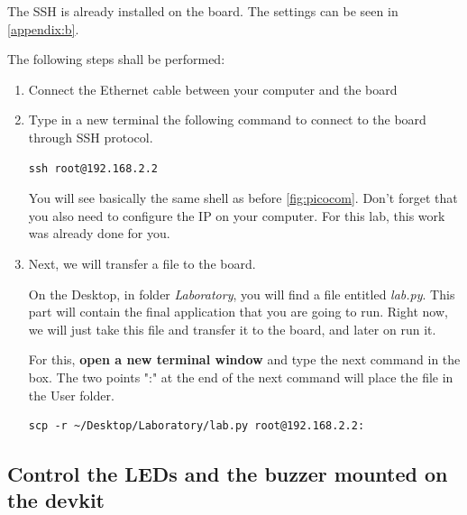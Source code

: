 The SSH is already installed on the board. The settings can be seen in \cref{appendix:b}.

The following steps shall be performed: 
\begin{enumerate}
    \item Connect the Ethernet cable between your computer and the board
    \item Type in a new terminal the following command to connect to the board through SSH protocol.
    \begin{tcolorbox}
        \begin{verbatim}
ssh root@192.168.2.2
        \end{verbatim}
    \end{tcolorbox}
    You will see basically the same shell as before \ref{fig:picocom}.
    Don't forget that you also need to configure the IP on your computer. For this lab, this work was already done for you.

    \item Next, we will transfer a file to the board.

    On the Desktop, in folder \textit{Laboratory}, you will find a file entitled \textit{lab.py}. This part will contain the final application that you are going to run. Right now, we will just take this file and transfer it to the board, and later on run it.

    For this, \textbf{open a new terminal window} and type the next command in the box. The two points ":" at the end of the next command will place the file in the User folder.
    \begin{tcolorbox}
     \begin{verbatim}
scp -r ~/Desktop/Laboratory/lab.py root@192.168.2.2:
    \end{verbatim}
    \end{tcolorbox}






\end{enumerate}




\subsection{Control the LEDs and the buzzer mounted on the devkit}


